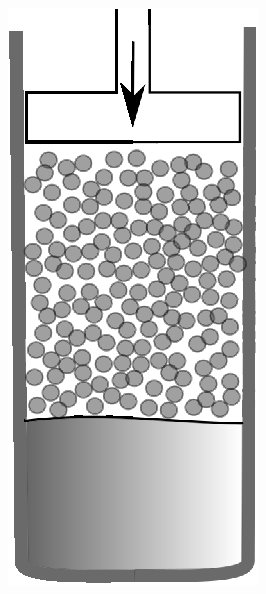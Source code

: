 \documentclass[a4paper,12pt,fleqn,twoside,openany]{book}
\begin{document}
\begin{figure}[h]
 \centering
    \begin{subfigure}{0.2\textwidth}
        \includegraphics[width=\textwidth]{Img/Procedimiento/proceso1.eps}

\end{subfigure}
\end{figure}
\end{document}
